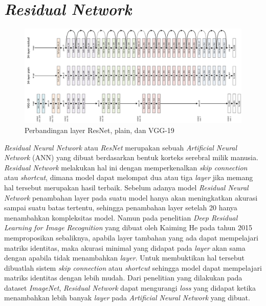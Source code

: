 \section{\textit{Residual Network}}
\vspace{1ex}

\begin{figure}[h!]
	\centering
	\includegraphics[scale=0.18]{img/ResNet.png}
	\caption{Perbandingan layer ResNet, plain, dan VGG-19 \cite{cit:10}}
	\label{fig:Resnet}
\end{figure}
\vspace{1ex}

\textit{Residual Neural Network} atau \textit{ResNet} merupakan sebuah \textit{Artificial Neural Network} (ANN) yang dibuat berdasarkan bentuk korteks serebral milik manusia. \textit{Residual Network} melakukan hal ini dengan memperkenalkan \textit{skip connection} atau \textit{shortcut}, dimana model dapat melompat dua atau tiga \textit{layer} jika memang hal tersebut merupakan hasil terbaik. Sebelum adanya model \textit{Residual Neural Network} penambahan layer pada suatu model hanya akan meningkatkan akurasi sampai suatu batas tertentu, sehingga penambahan layer setelah 20 hanya menambahkan kompleksitas model. Namun pada penelitian \textit{Deep Residual Learning for Image Recognition} yang dibuat oleh Kaiming He pada tahun 2015 memproposikan sebaliknya, apabila layer tambahan yang ada dapat mempelajari matriks identitas, maka akurasi minimal yang didapat pada \textit{layer} akan sama dengan apabila tidak menambahkan \textit{layer}. Untuk membuktikan hal tersebut dibuatlah sistem \textit{skip connection} atau \textit{shortcut} sehingga model dapat mempelajari matriks identitas dengan lebih mudah. Dari penelitian yang dilakukan pada dataset \textit{ImageNet}, \textit{Residual Network} dapat mengurangi \textit{loss} yang didapat ketika menambahkan lebih banyak \textit{layer} pada \textit{Artificial Neural Network} yang dibuat. \cite{cit:10}

